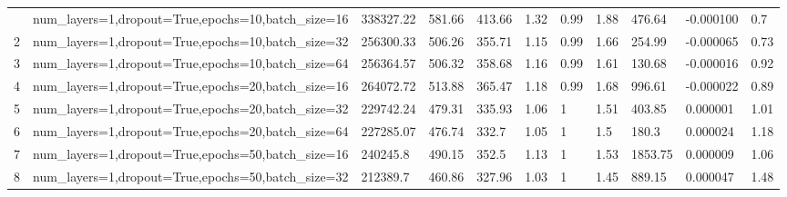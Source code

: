 \begin{longtable}{C{0.8cm} L{2cm} C{1.15cm} C{1.15cm} C{1.15cm} C{1.15cm} C{0.85cm} C{1.25cm} C{1.2cm} C{1.5cm} C{1.0cm}}
\bottomrule
{} & num\_layers=1,\newline dropout=True,\newline epochs=10,\newline batch\_size=16 & 338327.22 & 581.66 & 413.66 & 1.32 & 0.99 & 1.88 & 476.64 & -0.000100 & 0.7 \\
2 & num\_layers=1,\newline dropout=True,\newline epochs=10,\newline batch\_size=32 & 256300.33 & 506.26 & 355.71 & 1.15 & 0.99 & 1.66 & 254.99 & -0.000065 & 0.73 \\
3 & num\_layers=1,\newline dropout=True,\newline epochs=10,\newline batch\_size=64 & 256364.57 & 506.32 & 358.68 & 1.16 & 0.99 & 1.61 & 130.68 & -0.000016 & 0.92 \\
4 & num\_layers=1,\newline dropout=True,\newline epochs=20,\newline batch\_size=16 & 264072.72 & 513.88 & 365.47 & 1.18 & 0.99 & 1.68 & 996.61 & -0.000022 & 0.89 \\
5 & num\_layers=1,\newline dropout=True,\newline epochs=20,\newline batch\_size=32 & 229742.24 & 479.31 & 335.93 & 1.06 & 1 & 1.51 & 403.85 & 0.000001 & 1.01 \\
6 & num\_layers=1,\newline dropout=True,\newline epochs=20,\newline batch\_size=64 & 227285.07 & 476.74 & 332.7 & 1.05 & 1 & 1.5 & 180.3 & 0.000024 & 1.18 \\
7 & num\_layers=1,\newline dropout=True,\newline epochs=50,\newline batch\_size=16 & 240245.8 & 490.15 & 352.5 & 1.13 & 1 & 1.53 & 1853.75 & 0.000009 & 1.06 \\
8 & num\_layers=1,\newline dropout=True,\newline epochs=50,\newline batch\_size=32 & 212389.7 & 460.86 & 327.96 & 1.03 & 1 & 1.45 & 889.15 & 0.000047 & 1.48 \\

\end{longtable}
